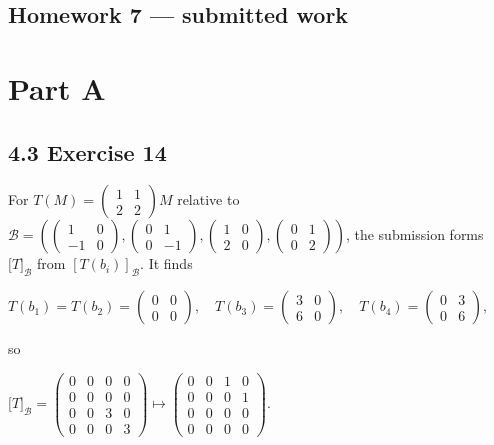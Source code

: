 \section{Homework 7 --- submitted work}

\chapter{Part A}

\section{4.3 Exercise 14}

For \(T(M) = \begin{pmatrix}
1 & 1 \\
2 & 2
\end{pmatrix}M\) relative to \(\mathcal{B} = \left( {\begin{pmatrix}
1 & 0 \\
{- 1} & 0
\end{pmatrix},\begin{pmatrix}
0 & 1 \\
0 & {- 1}
\end{pmatrix},\begin{pmatrix}
1 & 0 \\
2 & 0
\end{pmatrix},\begin{pmatrix}
0 & 1 \\
0 & 2
\end{pmatrix}} \right)\), the submission forms \(\lbrack T\rbrack_{\mathcal{B}}\) from \(\left\lbrack {T\left( b_{i} \right)} \right\rbrack_{\mathcal{B}}\). It finds

\(T\left( b_{1} \right) = T\left( b_{2} \right) = \begin{pmatrix}
0 & 0 \\
0 & 0
\end{pmatrix},\quad T\left( b_{3} \right) = \begin{pmatrix}
3 & 0 \\
6 & 0
\end{pmatrix},\quad T\left( b_{4} \right) = \begin{pmatrix}
0 & 3 \\
0 & 6
\end{pmatrix},\)

so

\(\lbrack T\rbrack_{\mathcal{B}} = \begin{pmatrix}
0 & 0 & 0 & 0 \\
0 & 0 & 0 & 0 \\
0 & 0 & 3 & 0 \\
0 & 0 & 0 & 3
\end{pmatrix}\mapsto\begin{pmatrix}
0 & 0 & 1 & 0 \\
0 & 0 & 0 & 1 \\
0 & 0 & 0 & 0 \\
0 & 0 & 0 & 0
\end{pmatrix}.\)


